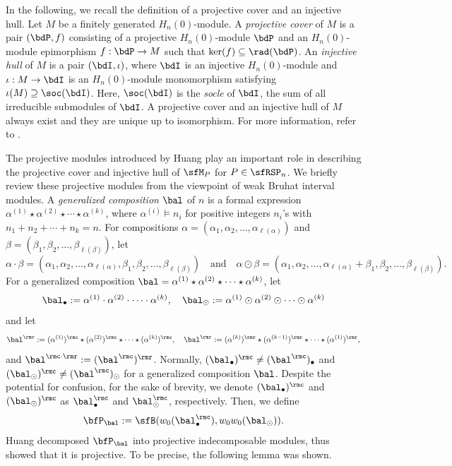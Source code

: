 \documentclass[12pt, reqno]{amsart}
\theoremstyle{definition}
\numberwithin{equation}{section} \numberwithin{figure}{section}
\numberwithin{table}{section}
\begin{document}
In the following, we recall the definition of a projective cover and an injective hull.
Let $M$ be a finitely generated $H_n(0)$-module. 
A \emph{projective cover} of $M$ is a pair $(\bdP, f)$ consisting of a projective $H_n(0)$-module $\bdP$ and an $H_n(0)$-module epimorphism $f: \bdP \rightarrow M$ such that $\ker(f) \subseteq \rad(\bdP)$.
An \emph{injective hull} of $M$ is a pair $(\bdI, \iota)$, where $\bdI$ is an injective $H_n(0)$-module and $\iota: M \rightarrow \bdI$ is an $H_n(0)$-module monomorphism satisfying $\iota(M) \supseteq \soc(\bdI)$.
Here, $\soc(\bdI)$  is the \emph{socle} of $\bdI$, the sum of all irreducible submodules of $\bdI$.
A projective cover and an injective hull of $M$ always exist and they are unique up to isomorphism.
For more information, refer to \cite{95ARS, 99Lam}.


The projective modules introduced by Huang \cite{16Huang} play an important role in describing the projective cover and injective hull of $\sfM_P$ for $P \in \sfRSP_n$.
We briefly review these projective modules from the viewpoint of weak Bruhat interval modules.
A \emph{generalized composition} $\bal$ of $n$ is a formal expression $\alpha^{(1)} \star \alpha^{(2)} \star \cdots \star  \alpha^{(k)}$,
where $\alpha^{(i)} \models n_i$ for positive integers $n_i$'s with $n_1 + n_2 + \cdots + n_k = n$.
For compositions $\alpha = (\alpha_1, \alpha_2, \ldots, \alpha_{\ell(\alpha)})$ and $\beta = (\beta_1, \beta_2, \ldots, \beta_{\ell(\beta)})$, let 
$$
\alpha \cdot \beta = (\alpha_1, \alpha_2, \ldots, \alpha_{\ell(\alpha)}, \beta_1, \beta_2, \ldots, \beta_{\ell(\beta)})
\quad \text{and} \quad 
\alpha \odot \beta = (\alpha_1, \alpha_2, \ldots, \alpha_{\ell(\alpha)}+\beta_1, \beta_2, \ldots, \beta_{\ell(\beta)}).
$$
For a generalized composition $\bal = \alpha^{(1)} \star \alpha^{(2)} \star \cdots \star \alpha^{(k)}$, let
\[
\bal_{\bullet} := \alpha^{(1)} \cdot \alpha^{(2)} \cdot \cdots \cdot \alpha^{(k)}, \quad \bal_{\odot} := \alpha^{(1)} \odot \alpha^{(2)} \odot \cdots \odot \alpha^{(k)}
\]
and let 
\[
\bal^\rmc  := (\alpha^{(1)})^\rmc \star (\alpha^{(2)})^\rmc \star \cdots \star (\alpha^{(k)})^\rmc,
\quad
\bal^\rmr  := (\alpha^{(k)})^\rmr \star (\alpha^{(k-1)})^\rmr \star \cdots \star (\alpha^{(1)})^\rmr,
\]
and $\bal^{\rmc \cdot \rmr} := (\bal^\rmc)^\rmr$.
Normally, $(\bal_{\bullet})^\rmc \neq (\bal^\rmc)_{\bullet}$ and $(\bal_{\odot})^\rmc \neq (\bal^\rmc)_{\odot}$ for a generalized composition $\bal$.
Despite the potential for confusion, for the sake of brevity, we denote $(\bal_{\bullet})^\rmc$ and $(\bal_{\odot})^\rmc$  as $\bal_{\bullet}^\rmc$ and $\bal_{\odot}^\rmc$, respectively.
Then, we define 
$$
\bfP_\bal := 
\sfB(w_0(\bal_{\bullet}^\rmc), w_0w_0(\bal_{\odot})).
$$
Huang decomposed $\bfP_{\bal}$ into projective indecomposable modules, thus showed that it is projective.
To be precise, the following lemma was shown.
\end{document}
